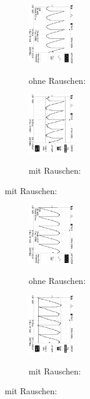 \begin{figure}
\caption{$U_{out} (\phi = 210°$)}
\begin{subfigure}{0.48\textwidth}
\centering
\caption*{ohne Rauschen:}
\includegraphics[angle=90,height=2.6cm]{graphics/ALL0036/F0036TEK.jpg}
\label{fig:phi210o}
\end{subfigure}
\begin{subfigure}{0.48\textwidth}
\centering
\caption*{mit Rauschen:}
\includegraphics[angle=90,height=2.6cm]{graphics/ALL0044/F0044TEK.jpg}
\label{fig:phi210m}
\end{subfigure}
\end{figure}
\addtocounter{figure}{-1}
\begin{figure}
\caption{$U_{out} (\phi = 45°$) }
\begin{subfigure}{0.48\textwidth}
\centering
\caption*{ohne Rauschen:}
\includegraphics[angle=90,height=2.6cm]{graphics/ALL0037/F0037TEK.jpg}
\label{fig:phi45o}
\end{subfigure}
\begin{subfigure}{0.48\textwidth}
\centering
\caption*{mit Rauschen:}
\includegraphics[angle=90,height=2.6cm]{graphics/ALL0045/F0045TEK.jpg}
\label{fig:phi45m}
\end{subfigure}
\end{figure}
\addtocounter{figure}{-1}
